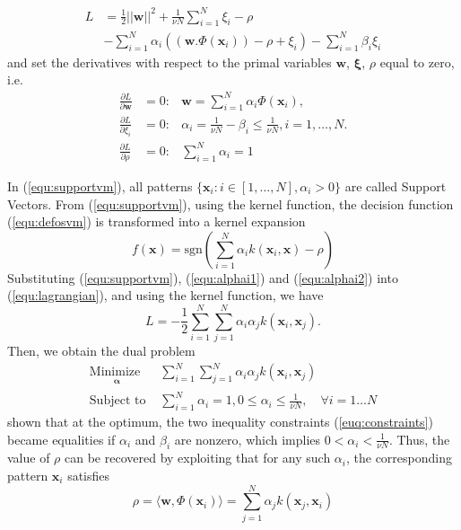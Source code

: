 \documentclass[conference]{IEEEtran}
\begin{document}
\begin{align}
\label{equ:lagrangian}
L &=\frac{1}{2}\left|\left| \mathbf{w}\right|\right|^2 + \frac{1}{\nu N}\sum_{i=1}^N\xi_i - \rho \nonumber \\
&-\sum_{i=1}^N\alpha_i((\mathbf{w}.\Phi(\mathbf{x}_i))-\rho +\xi_i)-\sum_{i=1}^N\beta_i\xi_i
\end{align}
and set the derivatives with respect to the primal variables $\mathbf{w}$, $\boldsymbol{\xi}$, $\rho$ equal to zero, i.e.
\begin{eqnarray}
\label{equ:supportvm}
\frac{\partial L}{\partial \mathbf{w}} & = 0: & \mathbf{w}=\sum_{i=1}^N\alpha_i\Phi(\mathbf{x}_i),\\%
\label{equ:alphai1}
\frac{\partial L}{\partial \xi_i}  & =0: & \alpha_i=\frac{1}{\nu N}-\beta_i \leq \frac{1}{\nu N},  i=1,\ldots,N. \\
\label{equ:alphai2}
\frac{\partial L}{\partial \rho} & = 0: & \sum_{i=1}^N\alpha_i=1
\end{eqnarray}

In (\ref{equ:supportvm}), all patterns $\{\mathbf{x}_i:i\in[1,\ldots,N], \alpha_i>0\}$ are called Support Vectors. From (\ref{equ:supportvm}), using the kernel function, the decision function (\ref{equ:defosvm}) is transformed into a kernel expansion 
\begin{equation}
\label{equ:defosvmker}
f(\mathbf{x})=\text{sgn}\left(\sum_{i=1}^N\alpha_i k(\mathbf{x}_i, \mathbf{x})- \rho\right)
\end{equation}
Substituting (\ref{equ:supportvm}), (\ref{equ:alphai1}) and (\ref{equ:alphai2}) into (\ref{equ:lagrangian}), and using the kernel function, we have 
\begin{equation}
\label{equ:lagrangianalpha}
L=-\frac{1}{2}\sum_{i=1}^N\sum_{j=1}^N \alpha_i\alpha_j k(\mathbf{x}_i, \mathbf{x}_j).
\end{equation}
Then, we obtain the dual problem
\begin{subequations}\label{euq:ocsvmker}
\begin{align}
\underset{
	\begin{array}{c}
		 \mathbf{\alpha}
	\end{array}}{\text{Minimize }} & \sum_{i=1}^N\sum_{j=1}^N \alpha_i\alpha_j k(\mathbf{x}_i, \mathbf{x}_j)\\
\text{Subject to } & \sum_{i=1}^N\alpha_i=1 ,  0\leq \alpha_i\leq \frac{1}{\nu N}, \quad \forall i=1\ldots N
\end{align}
\end{subequations}
\cite{scholkopf2001estimating} shown that at the optimum, the two inequality constraints (\ref{euq:constraints}) 
became equalities if $\alpha_i$ and $\beta_i$ are nonzero, which implies $0<\alpha_i<\frac{1}{\nu N}$. Thus, the value of $\rho$
can be recovered by exploiting that for any such $\alpha_i$, the corresponding pattern $ \mathbf{x}_i$ satisfies
\begin{equation}
\label{equ:rho}
\rho=\langle\mathbf{w},\Phi(\mathbf{x}_i)\rangle=\sum_{j=1}^N\alpha_j k(\mathbf{x}_j, \mathbf{x}_i)
\end{equation}
\end{document}
